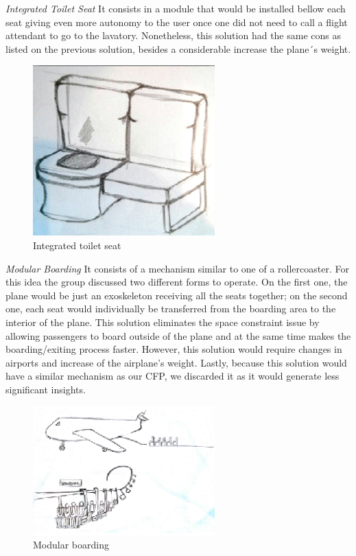 \emph{Integrated Toilet Seat} It consists in a module that would be installed bellow each seat giving even more autonomy to the user once one did not need to call a flight attendant to go to 
the lavatory. Nonetheless, this solution had the same cons as listed on the previous solution, besides a considerable increase the plane´s weight.

\begin{figure}[h]
\centering
\includegraphics[width=7cm]{brazil_images/image006.png}
\caption{Integrated toilet seat}
\label{fig:integrated_toilet}
\end{figure}


\emph{Modular Boarding} It consists of a mechanism similar to one of a rollercoaster. For this idea the group discussed two different forms to operate. On the first one, the plane would be just an exoskeleton receiving all the seats together; on the second one, each seat would individually be transferred from the boarding area to the interior of the plane. This solution eliminates the space constraint issue by allowing passengers to board outside of the plane and at the same time makes the boarding/exiting process faster. However, this solution would require changes in airports and increase of the airplane’s weight. Lastly, because this solution would have a similar mechanism as our CFP, we discarded it as it would generate less significant insights.

\begin{figure}[h]
\centering
\includegraphics[width=7cm]{brazil_images/image007.png}
\caption{Modular boarding}
\label{fig:modular_boarding}
\end{figure}



